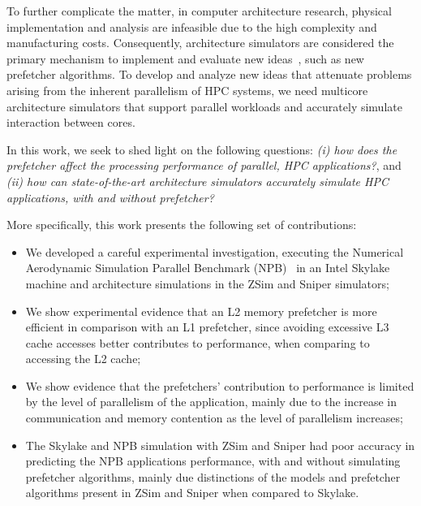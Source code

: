 \documentclass[AMA,final,STIX1COL]{WileyNJD-v2}
\newcommand{\ms}[1]{\textcolor{orange}{\bfseries \ul{ msserpa: #1} }\vspace{0.2cm}}
\newcommand{\fbm}[1]{\textcolor{red}{\bfseries \ul{fbm: #1} }\vspace{0.2cm}}
\begin{document}
To further complicate the matter, in computer architecture research, physical implementation and analysis are infeasible due to the high complexity and manufacturing costs. 
Consequently, architecture simulators are considered the primary mechanism to implement and evaluate new ideas~\cite{skadron2003challenges}, such as new prefetcher algorithms. 
To develop and analyze new ideas that attenuate problems arising from the inherent parallelism of HPC systems, we need multicore architecture simulators that support parallel workloads and accurately simulate interaction between cores.

In this work, we seek to shed light on the following questions: \textit{(i) how does the prefetcher affect the processing performance of parallel, HPC applications?}, and \textit{(ii) how can state-of-the-art architecture simulators accurately simulate HPC applications, with and without prefetcher?}

More specifically, this work presents the following set of contributions: %
\begin{itemize}
    \item We developed a careful experimental investigation, executing the Numerical Aerodynamic Simulation Parallel Benchmark (NPB)~\cite{jin1999openmp} %
    in an Intel Skylake machine and architecture simulations in the ZSim and Sniper simulators; 
    \item We show experimental evidence that an L2 memory prefetcher is more efficient in comparison with an L1 prefetcher, since avoiding excessive L3 cache accesses better contributes to performance, when comparing to accessing the L2 cache;
    \item We show evidence that the prefetchers' contribution to performance is limited by the level of parallelism of the application, mainly due to the increase in communication and memory contention as the level of parallelism increases;
    \item The Skylake and NPB simulation with ZSim and Sniper had poor accuracy in predicting the NPB applications performance, with and without simulating prefetcher algorithms, mainly due distinctions of the models and prefetcher algorithms present in ZSim and Sniper when compared to Skylake.
\end{itemize}
\end{document}
